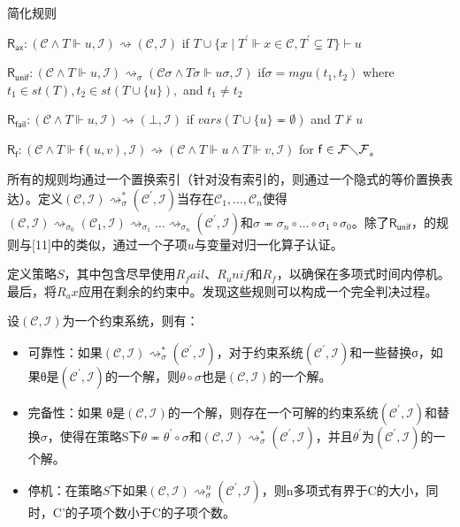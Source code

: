  \begin{table}
 \caption{简化规则}
$\mathsf{R_{ax}}:(\mathcal{C}\land T\Vdash u,\mathcal{I})\rightsquigarrow(\mathcal{C},\mathcal{I})$
if $T\cup\{x\mid T^{'}\Vdash x\in\mathcal{C},T^{'}\subsetneq T\}\vdash u$

$\mathsf{R_{unif}}:(\mathcal{C}\land T\Vdash u,\mathcal{I})\rightsquigarrow_{\sigma}(\mathcal{C\sigma}\land T\sigma\Vdash u\sigma,\mathcal{I})$
if$\sigma=mgu(t_{1},t_{2})$ where $t_{1}\in st(T),t_{2}\in st(T\cup\{u\}),$
and $t_{1}\neq t_{2}$

$\mathsf{R_{fail}}:(\mathcal{C}\land T\Vdash u,\mathcal{I})\rightsquigarrow(\bot,\mathcal{I})$
if $vars(T\cup\{u\}\eqcirc\emptyset)$ and $T\nvdash u$

$\mathsf{R_{f}}:(\mathcal{C}\land T\Vdash\mathsf{f}(u,v),\mathcal{I})\rightsquigarrow(\mathcal{C}\land T\Vdash u\land T\Vdash v,\mathcal{I})$
for $\mathsf{f}\in\mathcal{F\diagdown\mathcal{F}}_{s}$ 
 \end{table}

    所有的规则均通过一个置换索引（针对没有索引的，则通过一个隐式的等价置换表达）。定义$(\mathcal{C},\mathcal{I})\rightsquigarrow_{\sigma}^{*}(\mathcal{C}^{'},\mathcal{I})$当存在$\mathcal{C}_{1},...,\mathcal{C}_{n}$使得$(\mathcal{C},\mathcal{I})\rightsquigarrow_{\sigma_{0}}(\mathcal{C}_{1},\mathcal{I})\rightsquigarrow_{\sigma_{1}}\ldots\rightsquigarrow_{\sigma_{n}}(\mathcal{C}^{'},\mathcal{I})$和$\sigma\eqcirc\sigma_{n}\circ\ldots\circ\sigma_{1}\circ\sigma_{0}$。除了$\mathsf{R_{unif}}$，的规则与[11]中的类似，通过一个子项$u$与变量对归一化算子认证。

定义策略$S$，其中包含尽早使用$R_fail、R_unif$和$R_f$，以确保在多项式时间内停机。最后，将$R_ax$应用在剩余的约束中。发现这些规则可以构成一个完全判决过程。

\begin{definition} 设$(\mathcal{C},\mathcal{I})$为一个约束系统，则有：
\begin{itemize}
\item 可靠性：如果$(\mathcal{C},\mathcal{I})\rightsquigarrow_{\sigma}^{*}(\mathcal{C}^{'},\mathcal{I})$，对于约束系统$(\mathcal{C}^{'},\mathcal{I})$和一些替换σ，如果θ是$(\mathcal{C}^{'},\mathcal{I})$的一个解，则$\theta\circ\sigma$也是$(\mathcal{C},\mathcal{I})$的一个解。
\item 完备性：如果 θ是$(\mathcal{C},\mathcal{I})$的一个解，则存在一个可解的约束系统$(\mathcal{C}^{'},\mathcal{I})$和替换$\sigma$，使得在策略S下$\theta\eqcirc\theta^{'}\circ\sigma$和$(\mathcal{C},\mathcal{I})\rightsquigarrow_{\sigma}^{*}(\mathcal{C}^{'},\mathcal{I})$，并且$\theta^{'}$为$(\mathcal{C}^{'},\mathcal{I})$的一个解。
\item 停机：在策略$S$下如果$(\mathcal{C},\mathcal{I})\rightsquigarrow_{\sigma}^{n}(\mathcal{C}^{'},\mathcal{I})$，则n多项式有界于C的大小，同时，C’的子项个数小于C的子项个数。
\end{itemize}
\end{definition}


